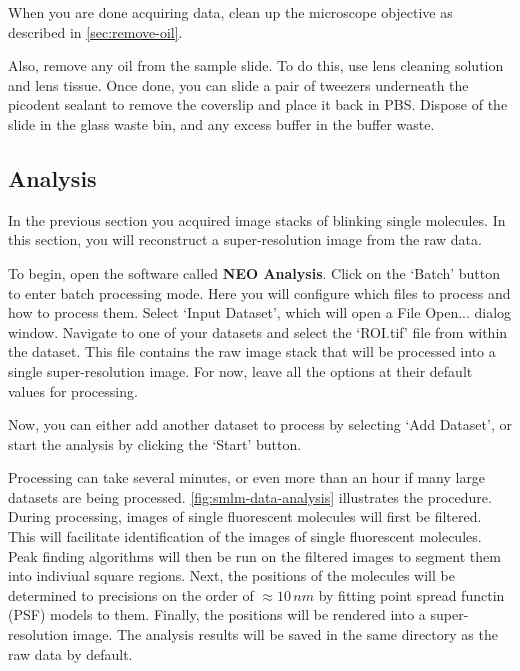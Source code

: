 \documentclass[10pt,a4paper,oneside]{book}
\begin{document}
\newline

When you are done acquiring data, clean up the microscope objective as described in \autoref{sec:remove-oil}.

Also, remove any oil from the sample slide. To do this, use lens cleaning solution and lens tissue. Once done, you can slide a pair of tweezers underneath the picodent sealant to remove the coverslip and place it back in PBS. Dispose of the slide in the glass waste bin, and any excess buffer in the buffer waste.

\subsection{Analysis}

In the previous section you acquired image stacks of blinking single molecules. In this section, you will reconstruct a super-resolution image from the raw data.

To begin, open the software called \textbf{NEO Analysis}. Click on the `Batch' button to enter batch processing mode. Here you will configure which files to process and how to process them. Select `Input Dataset', which will open a File Open... dialog window. Navigate to one of your datasets and select the `ROI.tif' file from within the dataset. This file contains the raw image stack that will be processed into a single super-resolution image. For now, leave all the options at their default values for processing.

Now, you can either add another dataset to process by selecting `Add Dataset', or start the analysis by clicking the `Start' button.

Processing can take several minutes, or even more than an hour if many large datasets are being processed. \autoref{fig:smlm-data-analysis} illustrates the procedure. During processing, images of single fluorescent molecules will first be filtered. This will facilitate identification of the images of single fluorescent molecules. Peak finding algorithms will then be run on the filtered images to segment them into indiviual square regions. Next, the positions of the molecules will be determined to precisions on the order of $\approx 10 \, nm$ by fitting point spread functin (PSF) models to them. Finally, the positions will be rendered into a super-resolution image. The analysis results will be saved in the same directory as the raw data by default.
\end{document}
